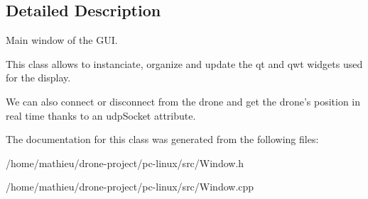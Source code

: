\subsection{Detailed Description}
Main window of the G\-U\-I. 

This class allows to instanciate, organize and update the qt and qwt widgets used for the display. \par
We can also connect or disconnect from the drone and get the drone's position in real time thanks to an udp\-Socket attribute. 

The documentation for this class was generated from the following files\-:\begin{DoxyCompactItemize}
\item 
/home/mathieu/drone-\/project/pc-\/linux/src/Window.\-h\item 
/home/mathieu/drone-\/project/pc-\/linux/src/Window.\-cpp\end{DoxyCompactItemize}
